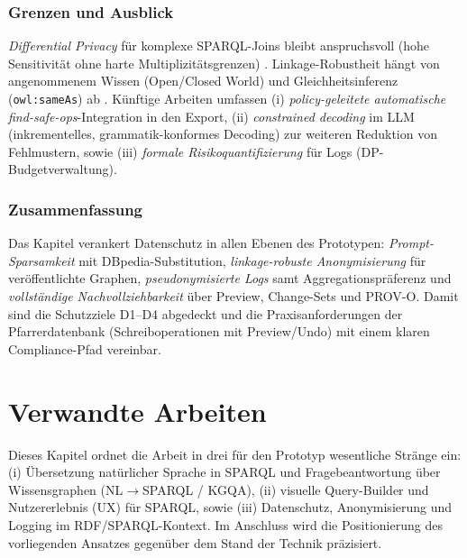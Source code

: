 \subsection{Grenzen und Ausblick}
\label{subsec:limits-privacy}

\emph{Differential Privacy} für komplexe SPARQL-Joins bleibt anspruchsvoll (hohe Sensitivität ohne harte Multiplizitätsgrenzen) \cite{buil_aranda_dp_sparql}. Linkage-Robustheit hängt von angenommenem Wissen (Open/Closed World) und Gleichheitsinferenz (\texttt{owl:sameAs}) ab \cite{delanaux_rdf_graph_anonymization_linkage,cuenca_kostylev_logical_foundations_ppdp_ld}. Künftige Arbeiten umfassen (i) \emph{policy-geleitete automatische find-safe-ops}-Integration in den Export, (ii) \emph{constrained decoding} im LLM (inkrementelles, grammatik-konformes Decoding) zur weiteren Reduktion von Fehlmustern, sowie (iii) \emph{formale Risikoquantifizierung} für Logs (DP-Budgetverwaltung).

\subsection*{Zusammenfassung}

Das Kapitel verankert Datenschutz in allen Ebenen des Prototypen: \emph{Prompt-Sparsamkeit} mit DBpedia-Substitution, \emph{linkage-robuste Anonymisierung} für veröffentlichte Graphen, \emph{pseudonymisierte Logs} samt Aggregationspräferenz und \emph{vollständige Nachvollziehbarkeit} über Preview, Change-Sets und PROV-O. Damit sind die Schutzziele D1–D4 abgedeckt und die Praxisanforderungen der Pfarrerdatenbank (Schreiboperationen mit Preview/Undo) mit einem klaren Compliance-Pfad vereinbar.










\chapter{Verwandte Arbeiten}
\label{sec:VerwandteArbeiten}

Dieses Kapitel ordnet die Arbeit in drei für den Prototyp wesentliche Stränge ein: (i) Übersetzung natürlicher Sprache in SPARQL und Fragebeantwortung über Wissensgraphen (NL$\rightarrow$SPARQL / KGQA), (ii) visuelle Query-Builder und Nutzererlebnis (UX) für SPARQL, sowie (iii) Datenschutz, Anonymisierung und Logging im RDF/SPARQL-Kontext. Im Anschluss wird die Positionierung des vorliegenden Ansatzes gegenüber dem Stand der Technik präzisiert.

